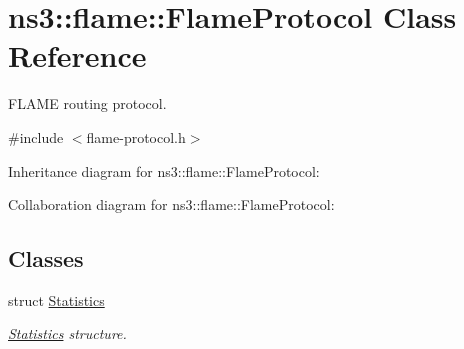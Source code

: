 \hypertarget{classns3_1_1flame_1_1FlameProtocol}{}\section{ns3\+:\+:flame\+:\+:Flame\+Protocol Class Reference}
\label{classns3_1_1flame_1_1FlameProtocol}


F\+L\+A\+ME routing protocol.  




{\ttfamily \#include $<$flame-\/protocol.\+h$>$}



Inheritance diagram for ns3\+:\+:flame\+:\+:Flame\+Protocol\+:


Collaboration diagram for ns3\+:\+:flame\+:\+:Flame\+Protocol\+:
\subsection*{Classes}
\begin{DoxyCompactItemize}
\item 
struct \hyperlink{structns3_1_1flame_1_1FlameProtocol_1_1Statistics}{Statistics}
\begin{DoxyCompactList}\small\item\em \hyperlink{structns3_1_1flame_1_1FlameProtocol_1_1Statistics}{Statistics} structure. \end{DoxyCompactList}\end{DoxyCompactItemize}
